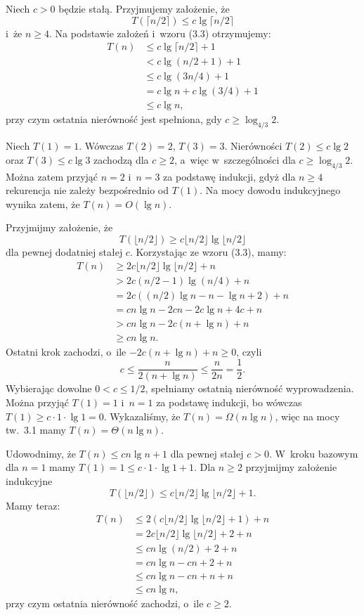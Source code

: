 
\exercise %
Niech $c>0$ będzie stałą.
Przyjmujemy założenie, że
\[
    T(\lceil n/2\rceil)\le c\lg\lceil n/2\rceil
\]
i~że $n\ge4$.
Na podstawie założeń i~wzoru (3.3) otrzymujemy:
\begin{align*}
	T(n) &\le c\lg\lceil n/2\rceil+1 \\
	&< c\lg(n/2+1)+1 \\
	&\le c\lg(3n/4)+1 \\
	&= c\lg n+c\lg(3/4)+1 \\
	&\le c\lg n,
\end{align*}
przy czym ostatnia nierówność jest spełniona, gdy $c\ge\log_{4/3}2$.

Niech $T(1)=1$.
Wówczas $T(2)=2$, $T(3)=3$.
Nierówności $T(2)\le c\lg2$ oraz $T(3)\le c\lg3$ zachodzą dla $c\ge2$, a~więc w~szczególności dla $c\ge\log_{4/3}2$.
Można zatem przyjąć $n=2$ i~$n=3$ za podstawę indukcji, gdyż dla $n\ge4$ rekurencja nie zależy bezpośrednio od $T(1)$.
Na mocy dowodu indukcyjnego wynika zatem, że $T(n)=O(\lg n)$.

\exercise %
Przyjmijmy założenie, że
\[
	T(\lfloor n/2\rfloor) \ge c\lfloor n/2\rfloor\lg\lfloor n/2\rfloor
\]
dla pewnej dodatniej stałej $c$.
Korzystając ze wzoru (3.3), mamy:
\begin{align*}
	T(n) &\ge 2c\lfloor n/2\rfloor\lg\lfloor n/2\rfloor+n \\
	&> 2c(n/2-1)\lg(n/4)+n \\
	&= 2c((n/2)\lg n-n-\lg n+2)+n \\
	&= cn\lg n-2cn-2c\lg n+4c+n \\
	&> cn\lg n-2c(n+\lg n)+n \\
	&\ge cn\lg n.
\end{align*}
Ostatni krok zachodzi, o~ile $-2c(n+\lg n)+n\ge0$, czyli
\[
	c \le \frac{n}{2(n+\lg n)} \le \frac{n}{2n} = \frac{1}{2}.
\]
Wybierając dowolne $0<c\le1/2$, spełniamy ostatnią nierówność wyprowadzenia.
Można przyjąć $T(1)=1$ i~$n=1$ za podstawę indukcji, bo wówczas $T(1)\ge c\cdot1\cdot\lg1=0$.
Wykazaliśmy, że $T(n)=\Omega(n\lg n)$, więc na mocy tw.\ 3.1 mamy $T(n)=\Theta(n\lg n)$.

\exercise %
Udowodnimy, że $T(n)\le cn\lg n+1$ dla pewnej stałej $c>0$.
W~kroku bazowym dla $n=1$ mamy $T(1)=1\le c\cdot1\cdot\lg1+1$.
Dla $n\ge2$ przyjmijmy założenie indukcyjne
\[
    T(\lfloor n/2\rfloor) \le c\lfloor n/2\rfloor\lg\lfloor n/2\rfloor+1.
\]
Mamy teraz:
\begin{align*}
    T(n) &\le 2(c\lfloor n/2\rfloor\lg\lfloor n/2\rfloor+1)+n \\
    &= 2c\lfloor n/2\rfloor\lg\lfloor n/2\rfloor+2+n \\
	&\le cn\lg(n/2)+2+n \\
	&= cn\lg n-cn+2+n \\
	&\le cn\lg n-cn+n+n \\
	&\le cn\lg n,
\end{align*}
przy czym ostatnia nierówność zachodzi, o~ile $c\ge2$.

